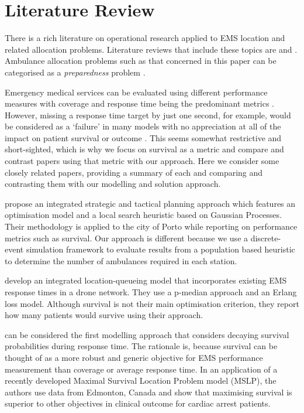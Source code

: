 \documentclass[numbers,webpdf,imaman]{ima-authoring-template}%
\begin{document}
\section{Literature Review}\label{sec:litreview}
There is a rich literature on operational research applied to EMS location and
related allocation problems. Literature reviews that include these topics are
\citet{aringhieri2017emergency, belanger2019recent, farahani2019or, Li2011, Liu2021, reuter2017logistics, mukhopadhyay22}
and \citet{wang2021emergency}. Ambulance allocation problems such as that
concerned in this paper can be categorised as a \textit{preparedness}
problem \citep{mukhopadhyay22}.

Emergency medical services can be evaluated using different performance
measures with coverage and response time being the predominant metrics
\citep{Mclay2010evaluating}. However, missing a response time target by just
one second, for example, would be considered as a `failure' in many models
with no appreciation at all of the impact on patient survival or outcome
\citep{Mclay2010evaluating}. This seems somewhat restrictive and short-sighted,
which is why we focus on survival as a metric and
compare and contrast papers using that metric with our approach.
Here we consider some closely related papers, providing a summary of each and
comparing and contrasting them with our modelling and solution approach.

\citet{amorim2019integrated} propose an integrated strategic and tactical
planning approach which features an optimisation model and a local search
heuristic based on Gaussian Processes. Their methodology is applied to the
city of Porto while reporting on performance metrics such as survival. Our
approach is different because we use a discrete-event simulation framework
to evaluate results from a population based heuristic to determine the number of
ambulances required in each station. 

\citet{boutilier2022drone} develop an integrated location-queueing model that
incorporates existing EMS response times in a drone network. They use a
p-median approach and an Erlang loss model. Although survival is not their
main optimisation criterion,  they report how many patients would survive
using their approach.

\citet{Erkut200842} can be considered the first modelling approach
that considers decaying survival probabilities during response time. The
rationale is, because survival can be thought of as a more robust and generic
objective for EMS performance measurement than coverage or average response
time. In an application of a recently developed Maximal Survival Location
Problem model (MSLP), the authors use data from Edmonton, Canada and show that
maximising survival is superior to other objectives in clinical outcome for
cardiac arrest patients.
\end{document}
